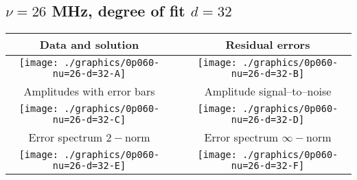 

% 

\clearpage{}
\break{}

\subsection{$\nu = 26$ MHz, degree of fit $d = 32$}

\begin{table}[h]
    \begin{center}
        \begin{tabular}{ccc}
            Data and solution & \quad & Residual errors \\\hline
            \texttt{[image: ./graphics/0p060-nu=26-d=32-A]} &&
            \texttt{[image: ./graphics/0p060-nu=26-d=32-B]} \\[15pt]
            Amplitudes with error bars && Amplitude signal--to--noise \\\hline
            \texttt{[image: ./graphics/0p060-nu=26-d=32-C]} &&
            \texttt{[image: ./graphics/0p060-nu=26-d=32-D]} \\[15pt]
            Error spectrum $2-$norm && Error spectrum $\infty-$norm \\\hline
            \texttt{[image: ./graphics/0p060-nu=26-d=32-E]} &&
            \texttt{[image: ./graphics/0p060-nu=26-d=32-F]} \\[15pt]
        \end{tabular}
    \end{center}
\label{fig:elev=60, nu=26}
\end{table}



\endinput
